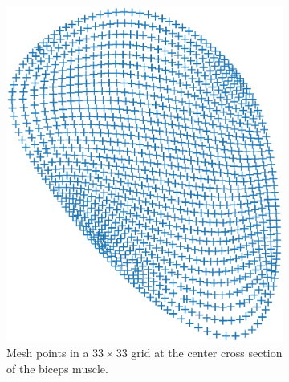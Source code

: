 \begin{figure}[H]
  \centering%
  \begin{subfigure}[t]{0.48\textwidth}%
    \centering%
    \includegraphics[width=\textwidth]{images/parallel_fiber_estimation/left_biceps_brachii_33x33fibers_bin_csv.pdf}%
    \caption{Mesh points in a $33\times 33$ grid at the center cross section of the biceps muscle.}%
    \label{fig:left_biceps_brachii_33x33fibers_bin_csv}%
  \end{subfigure}
  \quad
  \begin{subfigure}[t]{0.48\textwidth}%
    \centering%

\end{subfigure}
\end{figure}
